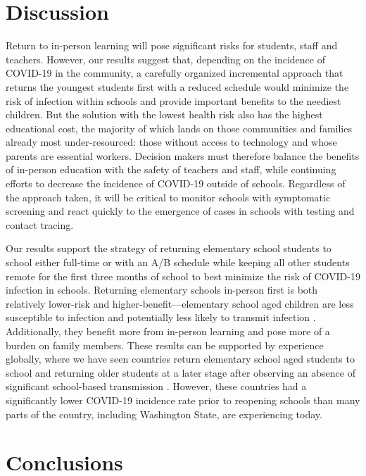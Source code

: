\documentclass[preprint,12pt]{elsarticle}
\begin{document}
\section{Discussion}

Return to in-person learning will pose significant risks for students, staff and teachers. However, our results suggest that, depending on the incidence of COVID-19 in the community, a carefully organized incremental approach that returns the youngest students first with a reduced schedule would minimize the risk of infection within schools and provide important benefits to the neediest children. But the solution with the lowest health risk also has the highest educational cost, the majority of which lands on those communities and families already most under-resourced: those without access to technology and whose parents are essential workers. Decision makers must therefore balance the benefits of in-person education with the safety of teachers and staff, while continuing efforts to decrease the incidence of COVID-19 outside of schools. Regardless of the approach taken, it will be critical to monitor schools with symptomatic screening and react quickly to the emergence of cases in schools with testing and contact tracing.

Our results support the strategy of returning elementary school students to school either full-time or with an A/B schedule while keeping all other students remote for the first three months of school to best minimize the risk of COVID-19 infection in schools. Returning elementary schools in-person first is both relatively lower-risk and higher-benefit—elementary school aged children are less susceptible to infection \cite{zhang_changes_2020} and potentially less likely to transmit infection \cite{park_early_nodate}. Additionally, they benefit more from in-person learning and pose more of a burden on family members. These results can be supported by experience globally, where we have seen countries return elementary school aged students to school and returning older students at a later stage after observing an absence of significant school-based transmission \cite{zhang_changes_2020, auger_association_2020}. However, these countries had a significantly lower COVID-19 incidence rate prior to reopening schools than many parts of the country, including Washington State, are experiencing today.

\section{Conclusions}
\end{document}
